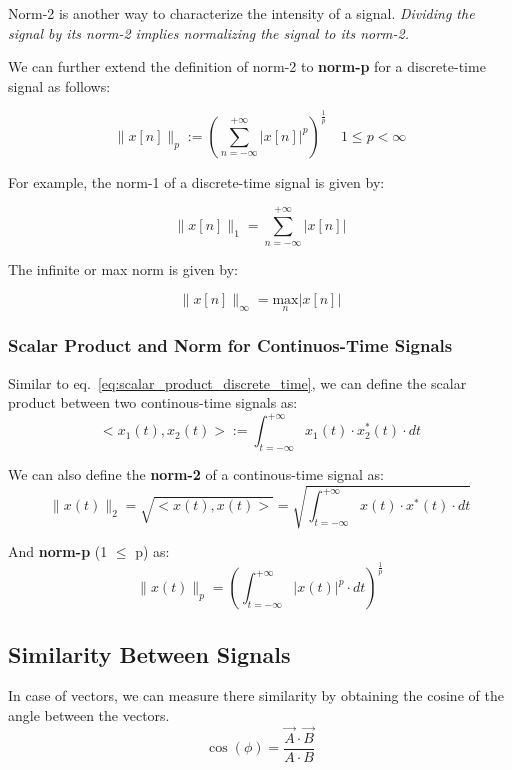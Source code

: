 \documentclass[letterpaper,12pt]{article}
\begin{document}
Norm-2 is another way to characterize the intensity of a signal.\textit{ Dividing the signal by its norm-2 implies normalizing the signal to its norm-2.}

We can further extend the definition of norm-2 to \textbf{norm-p}  for a discrete-time signal as follows:

\begin{equation}
    \label{eq:norm_p_discrete_time}
    \| x[n] \|_p := {(\sum_{n=-\infty}^{+\infty} |x[n]|^{p})}^{\frac{1}{p}} \quad 1 \leq p < \infty
\end{equation}

For example, the norm-1 of a discrete-time signal is given by:

\[\| x[n] \|_1 = \sum_{n=-\infty}^{+\infty} |x[n]| \]

The infinite or max norm is given by:

\[\| x[n] \|_\infty = \underset{n}{\text{max}} |x[n]| \]

\subsubsection*{Scalar Product and Norm for Continuos-Time Signals}

Similar to eq.~\ref{eq:scalar_product_discrete_time}, we can define the scalar product between two continous-time signals as:
\begin{equation}
    \label{eq:scalar_product_cont_time}
    <x_{1}(t), x_{2}(t)> := \int_{t=-\infty}^{+\infty} x_{1}(t) \cdot x_{2}^{*}(t) \cdot dt
\end{equation}

We can also define the \textbf{norm-2} of a continous-time signal as:
\begin{equation}
    \label{eq:norm_2_cont_time}
    \| x(t) \|_2 = \sqrt{<x(t), x(t)>} = \sqrt{\int_{t=-\infty}^{+\infty} x(t) \cdot x^{*}(t) \cdot dt}
\end{equation}

And \textbf{norm-p} (1 $\leq$ p) as:
\begin{equation}
    \label{eq:norm_p_cont_time}
    \| x(t) \|_p = {(\int_{t=-\infty}^{+\infty} |x(t)|^{p} \cdot dt)}^{\frac{1}{p}}
\end{equation}

\subsection*{Similarity Between Signals}
In case of vectors, we can measure there similarity by obtaining the cosine of the angle between the vectors.
\[\cos(\phi) = \frac{\Vec{A} \cdot \Vec{B}}{A \cdot B}\]
\end{document}

